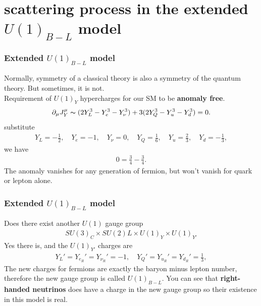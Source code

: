 \documentclass{beamer}
\begin{document}
\section{scattering process in the extended $U(1)_{B-L}$ model}
\begin{frame}
\frametitle{Extended $U(1)_{B-L}$ model}
Normally, symmetry of a classical theory is also a symmetry of the quantum theory. But sometimes, it is not.\\
Requirement of $U(1)_Y$ hypercharges for our SM to be \textbf{anomaly free}.
\begin{align*}
\partial_\mu J_Y^\mu \thicksim(2Y^3_L-Y_e^3-Y_\nu^3) + 3 (2Y^3_Q-Y_u^3-Y_d^3)=0.
\end{align*}
substitute
\begin{align*}
Y_L=-\frac{1}{2},\quad Y_e=-1, \quad Y_\nu=0,\quad  Y_Q=\frac{1}{6},\quad Y_u=\frac{2}{3},\quad Y_d=-\frac{1}{3},
\end{align*}
we have 
\begin{align*}
0=\frac{3}{4}-\frac{3}{4}.
\end{align*}
The anomaly vanishes for any generation of fermion, but won't vanish for quark or lepton alone.
\end{frame}
\begin{frame}
\frametitle{Extended $U(1)_{B-L}$ model}
Does there exist another $U(1)$ gauge group
\begin{align*}
SU(3)_C\times SU(2)L \times U(1)_Y\times U(1)_{Y'}
\end{align*}
Yes there is, and the $U(1)_{Y'}$ charges are
\begin{align*}
Y_L'=Y_{e_R}'=Y_{\nu_R}'=-1, \quad Y_Q'=Y_{u_R}'=Y_{d_R}'=\frac{1}{3},
\end{align*}
The new charges for fermions are exactly the baryon minus lepton number, therefore the new gauge group is called $U(1)_{B-L}$. You can see that \textbf{right-handed neutrinos} does have a charge in the new gauge group so their existence in this model is real.
\end{frame}
\end{document}
